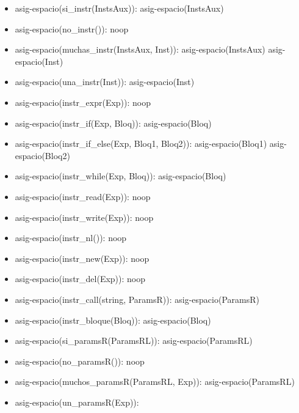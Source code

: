 \documentclass[11pt]{article}
\begin{document}
        \begin{itemize}
            \item asig-espacio(si\_instr(InstsAux)): 
                \subitem asig-espacio(InstsAux)
            \item asig-espacio(no\_instr()): 
                \subitem noop
            \item asig-espacio(muchas\_instr(InstsAux, Inst)): 
                \subitem asig-espacio(InstsAux)
                \subitem asig-espacio(Inst)
            \item asig-espacio(una\_instr(Inst)): 
                \subitem asig-espacio(Inst)
            \item asig-espacio(instr\_expr(Exp)): 
                \subitem noop
            \item asig-espacio(instr\_if(Exp, Bloq)): 
                \subitem asig-espacio(Bloq)
            \item asig-espacio(instr\_if\_else(Exp, Bloq1, Bloq2)): 
                \subitem asig-espacio(Bloq1)
                \subitem asig-espacio(Bloq2)
            \item asig-espacio(instr\_while(Exp, Bloq)): 
                \subitem asig-espacio(Bloq)
            \item asig-espacio(instr\_read(Exp)): 
                \subitem noop
            \item asig-espacio(instr\_write(Exp)): 
                \subitem noop
            \item asig-espacio(instr\_nl()): 
                \subitem noop
            \item asig-espacio(instr\_new(Exp)): 
                \subitem noop
            \item asig-espacio(instr\_del(Exp)): 
                \subitem noop
            \item asig-espacio(instr\_call(string, ParamsR)): 
                \subitem asig-espacio(ParamsR)
            \item asig-espacio(instr\_bloque(Bloq)): 
                \subitem asig-espacio(Bloq)
            \item asig-espacio(si\_paramsR(ParamsRL)): 
                \subitem asig-espacio(ParamsRL)
            \item asig-espacio(no\_paramsR()): 
                \subitem noop
            \item asig-espacio(muchos\_paramsR(ParamsRL, Exp)): 
                \subitem asig-espacio(ParamsRL)
            \item asig-espacio(un\_paramsR(Exp)): 

\end{itemize}
\end{document}
